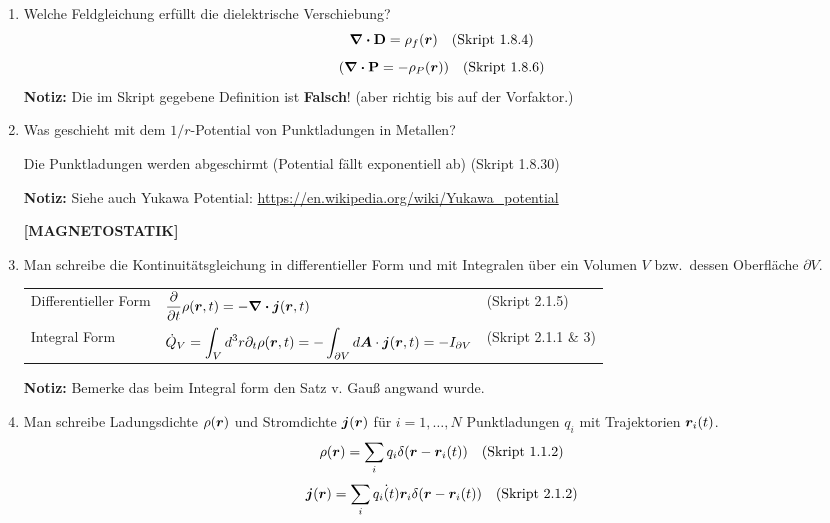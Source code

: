 \begin{enumerate}
  \item Welche Feldgleichung erfüllt die dielektrische Verschiebung?
        $$\div \vb D=\rho_f(\vb* r)\quad\text{(Skript 1.8.4)}$$
        $$\qty(\div \vb P=-\rho_P(\vb* r))\quad\text{(Skript 1.8.6)}$$
        \textbf{Notiz:} Die im Skript gegebene Definition ist 
        \textbf{Falsch}! (aber richtig bis auf der Vorfaktor.)

  \item Was geschieht mit dem $1/r$-Potential von Punktladungen in
        Metallen?
        \begin{center}
          Die Punktladungen werden abgeschirmt (Potential fällt 
          exponentiell ab)
          (Skript 1.8.30)
        \end{center}
        \textbf{Notiz:} Siehe auch Yukawa Potential: 
        \url{https://en.wikipedia.org/wiki/Yukawa_potential} 

  \clearpage
  \textbf{[MAGNETOSTATIK]}
  \item Man schreibe die Kontinuitätsgleichung in differentieller Form
        und mit Integralen über ein Volumen $V$ bzw.\ dessen Oberfläche 
        $\partial V$.
        \begin{center}
        \begin{tabular}{lll}
          Differentieller Form 
                            & $\displaystyle\pdv{t}\rho(\vb* r, t)=
                               -\div\vb* j(\vb* r, t)$
                              & (Skript 2.1.5)\\
          Integral Form     & $\displaystyle\dot Q_V
                              =\int_V d^3r\partial_t\rho(\vb* r,t)=
                              -\int_{\partial V}d\vb* A\cdot
                              \vb* j(\vb* r, t)=-I_{\partial V}$
                              & (Skript 2.1.1 \& 3)\\
        \end{tabular}
        \end{center}
        \textbf{Notiz:} Bemerke das beim Integral form den Satz v. Gauß
        angwand wurde.

  \item Man schreibe Ladungsdichte $\rho(\vb* r)$ und Stromdichte
        $\vb* j(\vb* r)$ für $i=1,\ldots,N$ Punktladungen $q_i$ mit 
        Trajektorien $\vb* r_i(t)$.
        $$\rho(\vb* r)=\sum_i q_i\delta(\vb* r-\vb* r_i(t))
        \quad \text{(Skript 1.1.2)}$$
        $$\vb* j(\vb* r)=\sum_i q_i\dot(t){\vb* r}_i\delta(\vb* r-\vb* r_i(t))
        \quad \text{(Skript 2.1.2)}$$


\end{enumerate}
